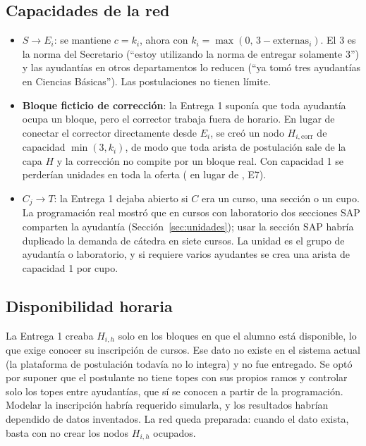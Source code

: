 \documentclass{article}
\begin{document}
\subsection{Capacidades de la red}
\begin{itemize}
    \item \textbf{$S \to E_i$}: se mantiene $c = k_i$, ahora con $k_i = \max(0,\, 3 - \text{externas}_i)$. El 3 es la norma del Secretario (``estoy utilizando la norma de entregar solamente 3'') y las ayudantías en otros departamentos lo reducen (``ya tomó tres ayudantías en Ciencias Básicas''). Las postulaciones no tienen límite.
    \item \textbf{Bloque ficticio de corrección}: la Entrega 1 suponía que toda ayudantía ocupa un bloque, pero el corrector trabaja fuera de horario. En lugar de conectar el corrector directamente desde $E_i$, se creó un nodo $H_{i,\text{corr}}$ de capacidad $\min(3, k_i)$, de modo que toda arista de postulación sale de la capa $H$ y la corrección no compite por un bloque real. Con capacidad 1 se perderían unidades en toda la oferta (\capCorrUnoOf{} en lugar de \capBaseOf, E7).
    \item \textbf{$C_j \to T$}: la Entrega 1 dejaba abierto si $C$ era un curso, una sección o un cupo. La programación real mostró que en cursos con laboratorio dos secciones SAP comparten la ayudantía (Sección~\ref{sec:unidades}); usar la sección SAP habría duplicado la demanda de cátedra en siete cursos. La unidad es el grupo de ayudantía o laboratorio, y si requiere varios ayudantes se crea una arista de capacidad 1 por cupo.
\end{itemize}

\subsection{Disponibilidad horaria}
La Entrega 1 creaba $H_{i,h}$ solo en los bloques en que el alumno está disponible, lo que exige conocer su inscripción de cursos. Ese dato no existe en el sistema actual (la plataforma de postulación todavía no lo integra) y no fue entregado. Se optó por suponer que el postulante no tiene topes con sus propios ramos y controlar solo los topes entre ayudantías, que sí se conocen a partir de la programación. Modelar la inscripción habría requerido simularla, y los resultados habrían dependido de datos inventados. La red queda preparada: cuando el dato exista, basta con no crear los nodos $H_{i,h}$ ocupados.
\end{document}

